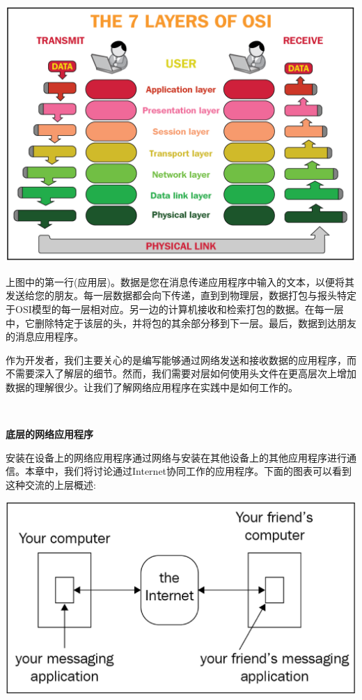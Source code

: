 \begin{center}
	\includegraphics[width=1.0\textwidth]{content/Section-2/Chapter-12/1}
\end{center}

上图中的第一行(应用层)。数据是您在消息传递应用程序中输入的文本，以便将其发送给您的朋友。每一层数据都会向下传递，直到到物理层，数据打包与报头特定于OSI模型的每一层相对应。另一边的计算机接收和检索打包的数据。在每一层中，它删除特定于该层的头，并将包的其余部分移到下一层。最后，数据到达朋友的消息应用程序。 \par
作为开发者，我们主要关心的是编写能够通过网络发送和接收数据的应用程序，而不需要深入了解层的细节。然而，我们需要对层如何使用头文件在更高层次上增加数据的理解很少。让我们了解网络应用程序在实践中是如何工作的。 \par

\noindent\textbf{}\ \par
\textbf{底层的网络应用程序} \ \par
安装在设备上的网络应用程序通过网络与安装在其他设备上的其他应用程序进行通信。本章中，我们将讨论通过Internet协同工作的应用程序。下面的图表可以看到这种交流的上层概述: \par

\begin{center}
	\includegraphics[width=1.0\textwidth]{content/Section-2/Chapter-12/2}
\end{center}

